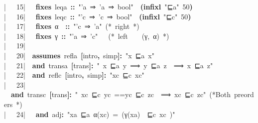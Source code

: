 \documentclass{article}
\newcommand{\syntaxCOMMENTA}[1]{\textcolor[rgb]{0.8,0.0,0.0}{#1}}
\newcommand{\syntaxKEYWORDB}[1]{\textcolor[rgb]{0.0,0.6,0.4}{\textbf{#1}}}
\newcommand{\syntaxLITERALA}[1]{\textcolor[rgb]{1.0,0.0,0.8}{#1}}
\newcommand{\syntaxOPERATOR}[1]{\textcolor[rgb]{0.0,0.0,0.0}{\textbf{#1}}}
\newcommand{\syntaxCOMMENTA}[1]{\textcolor[rgb]{0.8,0.0,0.0}{#1}}
\newcommand{\syntaxKEYWORDB}[1]{\textcolor[rgb]{0.0,0.6,0.4}{\textbf{#1}}}
\newcommand{\syntaxLITERALA}[1]{\textcolor[rgb]{1.0,0.0,0.8}{#1}}
\newcommand{\syntaxOPERATOR}[1]{\textcolor[rgb]{0.0,0.0,0.0}{\textbf{#1}}}
\newcommand{\syntaxCOMMENTA}[1]{\textcolor[rgb]{0.8,0.0,0.0}{#1}}
\newcommand{\syntaxKEYWORDB}[1]{\textcolor[rgb]{0.0,0.6,0.4}{\textbf{#1}}}
\newcommand{\syntaxLITERALA}[1]{\textcolor[rgb]{1.0,0.0,0.8}{#1}}
\newcommand{\syntaxOPERATOR}[1]{\textcolor[rgb]{0.0,0.0,0.0}{\textbf{#1}}}
\newcommand{\syntaxCOMMENTA}[1]{\textcolor[rgb]{0.8,0.0,0.0}{\textbf{#1}}}
\newcommand{\syntaxKEYWORDB}[1]{\textcolor[rgb]{0.0,0.6,0.4}{#1}}
\newcommand{\syntaxLITERALA}[1]{\textcolor[rgb]{1.0,0.0,0.8}{\textbf{#1}}}
\newcommand{\syntaxOPERATOR}[1]{\textcolor[rgb]{0.0,0.0,0.0}{#1}}
\newcommand{\syntaxCOMMENTA}[1]{\textcolor[rgb]{0.8,0.0,0.0}{#1}}
\newcommand{\syntaxKEYWORDB}[1]{\textcolor[rgb]{0.0,0.6,0.4}{\textbf{#1}}}
\newcommand{\syntaxLITERALA}[1]{\textcolor[rgb]{1.0,0.0,0.8}{#1}}
\newcommand{\syntaxOPERATOR}[1]{\textcolor[rgb]{0.0,0.0,0.0}{\textbf{#1}}}
\newcommand{\syntaxCOMMENTA}[1]{\textcolor[rgb]{0.8,0.0,0.0}{#1}}
\newcommand{\syntaxKEYWORDB}[1]{\textcolor[rgb]{0.0,0.6,0.4}{\textbf{#1}}}
\newcommand{\syntaxLITERALA}[1]{\textcolor[rgb]{1.0,0.0,0.8}{#1}}
\newcommand{\syntaxOPERATOR}[1]{\textcolor[rgb]{0.0,0.0,0.0}{\textbf{#1}}}
\newcommand{\syntaxCOMMENTA}[1]{\textcolor[rgb]{0.0,0.0,0.0}{#1}}
\newcommand{\syntaxKEYWORDB}[1]{\textcolor[rgb]{0.0,0.0,0.0}{#1}}
\newcommand{\gutter}[1]{\textcolor[rgb]{0,0,0}{{|}#1}}
\newcommand{\gutterH}[1]{\textcolor[rgb]{1,0,0}{{|}#1}}
\begin{document}
\gutterH{\ \ \ 15{|}\ }{\ }{\ }\syntaxKEYWORDB{fixes}{\ }leqa{\ }\syntaxOPERATOR{::}{\ }\syntaxLITERALA{"'a{\ }⇒{\ }'a{\ }⇒{\ }bool"}{\ }{\ }\syntaxOPERATOR{(}\syntaxKEYWORDB{infixl}{\ }\syntaxLITERALA{"⊑a"}{\ }50\syntaxOPERATOR{)}\hspace*{\fill}\\
\gutter{\ \ \ 16{|}\ }{\ }{\ }\syntaxKEYWORDB{fixes}{\ }leqc{\ }\syntaxOPERATOR{::}{\ }\syntaxLITERALA{"'c{\ }⇒{\ }'c{\ }⇒{\ }bool"}{\ }{\ }\syntaxOPERATOR{(}\syntaxKEYWORDB{infixl}{\ }\syntaxLITERALA{"⊑c"}{\ }50\syntaxOPERATOR{)}\hspace*{\fill}\\
\gutter{\ \ \ 17{|}\ }{\ }{\ }\syntaxKEYWORDB{fixes}{\ }α{\ }{\ }\syntaxOPERATOR{::}{\ }\syntaxLITERALA{"'c{\ }⇒{\ }'a"}{\ }\syntaxCOMMENTA{(*{\ }right{\ }*)}\hspace*{\fill}\\
\gutter{\ \ \ 18{|}\ }{\ }{\ }\syntaxKEYWORDB{fixes}{\ }γ{\ }\syntaxOPERATOR{::}{\ }\syntaxLITERALA{"'a{\ }⇒{\ }'c"}{\ }{\ }{\ }\syntaxCOMMENTA{(*{\ }left{\ }{\ }{\ }{\ }(γ,{\ }α){\ }*)}\hspace*{\fill}\\
\gutter{\ \ \ 19{|}\ }{\ }\hspace*{\fill}\\
\gutterH{\ \ \ 20{|}\ }{\ }\syntaxKEYWORDB{assumes}{\ }refla{\ }\syntaxOPERATOR{{[}}intro\syntaxOPERATOR{,}{\ }simp\syntaxOPERATOR{{]}}\syntaxOPERATOR{:}{\ }\syntaxLITERALA{"x{\ }⊑a{\ }x"}\hspace*{\fill}\\
\gutter{\ \ \ 21{|}\ }{\ }\syntaxKEYWORDB{and}{\ }transa{\ }\syntaxOPERATOR{{[}}trans\syntaxOPERATOR{{]}}\syntaxOPERATOR{:}{\ }\syntaxLITERALA{"{\ }x{\ }⊑a{\ }y{\ }⟹{\ }y{\ }⊑a{\ }z{\ }{\ }⟹{\ }x{\ }⊑a{\ }z"}\hspace*{\fill}\\
\gutter{\ \ \ 22{|}\ }{\ }\syntaxKEYWORDB{and}{\ }reflc{\ }\syntaxOPERATOR{{[}}intro\syntaxOPERATOR{,}{\ }simp\syntaxOPERATOR{{]}}\syntaxOPERATOR{:}{\ }\syntaxLITERALA{"xc{\ }⊑c{\ }xc"}\hspace*{\fill}\\
\gutter{\ \ \ 23{|}\ }{\ }\syntaxKEYWORDB{and}{\ }transc{\ }\syntaxOPERATOR{{[}}trans\syntaxOPERATOR{{]}}\syntaxOPERATOR{:}{\ }\syntaxLITERALA{"{\ }xc{\ }⊑c{\ }yc{\ }==\usebox{\greaterthan}{\ }yc{\ }⊑c{\ }zc{\ }{\ }⟹{\ }xc{\ }⊑c{\ }zc"}{\ }\syntaxCOMMENTA{(*Both{\ }pre\usebox{\underscorebox}orders{\ }*)}\hspace*{\fill}\\
\gutter{\ \ \ 24{|}\ }{\ }{\ }\syntaxKEYWORDB{and}{\ }adj\syntaxOPERATOR{:}{\ }\syntaxLITERALA{"xa{\ }⊑a{\ }α(xc){\ }={\ }(γ(xa){\ }{\ }⊑c{\ }xc{\ })"}{\ }\hspace*{\fill}\\
\end{document}
